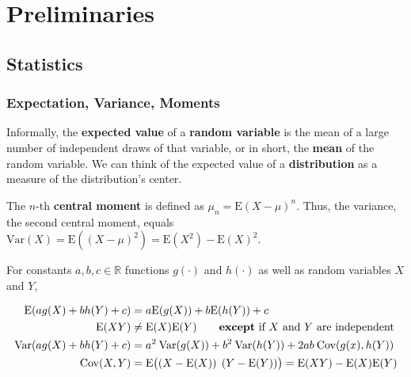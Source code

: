





\newcommand{\zftitle}{Advanced Macroeconometrics}
\newcommand{\zfauthor}{Max Heinze}
\newcommand{\zfdate}{Summer Term 2023}





\setcounter{section}{-1}



\section{Preliminaries}

\subsection{Statistics}

\subsubsection{Expectation, Variance, Moments}

Informally, the \textbf{expected value} of a \textbf{random variable} is the mean of a large number of independent draws of that variable, or in short, the \textbf{mean} of the random variable. We can think of the expected value of a \textbf{distribution} as a measure of the distribution's center. 

The $n$-th \textbf{central moment} is defined as $\mu_n=\mathrm{E}(X-\mu)^n$. Thus, the variance, the second central moment, equals $\mathrm{Var}(X) = \mathrm{E}((X-\mu)^2) = \mathrm{E}(X^2) - \mathrm{E}(X)^2$.

For constants $a, b,c \in \mathbb{R}$ functions $g(\cdot)$ and $h(\cdot)$ as well as random variables $X$ and $Y$,

\begin{align}
	\mathrm{E}(ag(X)+bh(Y)+c) &= a\mathrm{E}(g(X)) + b\mathrm{E}(h(Y)) + c \\
	\mathrm{E}(XY) &\neq \mathrm{E}(X)\mathrm{E}(Y) \qquad\text{\textbf{except} if $X$ and $Y$ are independent} \\
	\mathrm{Var}(ag(X)+bh(Y)+c) &= a^2\:\mathrm{Var}(g(X)) + b^2\:\mathrm{Var}(h(Y)) + 2ab\:\mathrm{Cov}(g(x), h(Y)) \\
	\mathrm{Cov}(X,Y) &= \mathrm{E}\big((X-\mathrm{E}(X))\:\:(Y-\mathrm{E}(Y))\big) = \mathrm{E}(XY) - \mathrm{E}(X)\mathrm{E}(Y)
\end{align}

